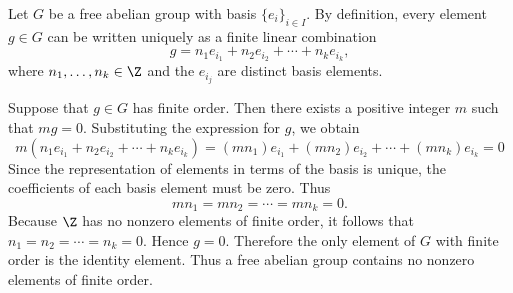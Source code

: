 \begin{solution}
  Let $G$ be a free abelian group with basis $\{e_i\}_{i \in I}$. By definition, every element $g \in G$ can be written uniquely as a finite linear combination
  \[%
    g = n_1 e_{i_1} + n_2 e_{i_2} + \cdots + n_k e_{i_k}
  ,\]%
  where $n_1, \dots, n_k \in \Z$ and the $e_{i_j}$ are distinct basis elements.

  Suppose that $g \in G$ has finite order. Then there exists a positive integer $m$ such that $mg = 0$. Substituting the expression for $g$, we obtain
  \[%
    m(n_1 e_{i_1} + n_2 e_{i_2} + \cdots + n_k e_{i_k}) = (mn_1)e_{i_1} + (mn_2)e_{i_2} + \cdots + (mn_k)e_{i_k} = 0
  \]%
  Since the representation of elements in terms of the basis is unique, the coefficients of each basis element must be zero. Thus
  \[%
    mn_1 = mn_2 = \cdots = mn_k = 0
  .\]%
  Because $\Z$ has no nonzero elements of finite order, it follows that $n_1 = n_2 = \cdots = n_k = 0$. Hence $g = 0$. Therefore the only element of $G$ with finite order is the identity element. Thus a free abelian group contains no nonzero elements of finite order.
\end{solution}
